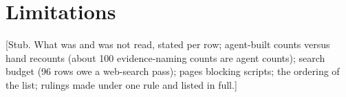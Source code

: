 \documentclass[11pt]{article}
\newcommand{\proof}[1]{{\color{red}\textsf{[#1]}}}
\begin{document}
\section{Limitations}\label{sec:lim}
\proof{Stub. What was and was not read, stated per row; agent-built counts versus hand recounts (about 100 evidence-naming counts are agent counts); search budget (96 rows owe a web-search pass); pages blocking scripts; the ordering of the list; rulings made under one rule and listed in full.}
\end{document}

